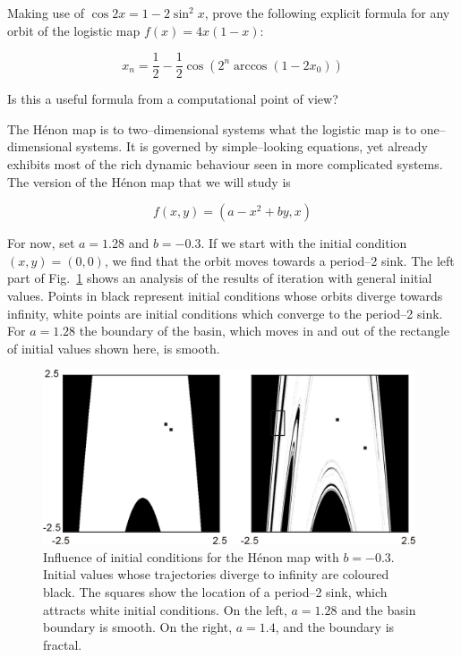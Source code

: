 \begin{exer}
Making use of $\cos 2x = 1- 2 \sin^2 x$, prove the following explicit formula for any orbit of the logistic map $f(x) = 4x(1-x)$:

$$x_n= \frac{1}{2} -\frac{1}{2} \cos(2^n\arccos(1-2x_0))$$

Is this a useful formula from a computational point of view?
\end{exer}


\pagebreak


The H\'{e}non map is to two--dimensional systems what the logistic map is to one--dimensional systems. It is governed by simple--looking equations, yet already exhibits most of the rich dynamic behaviour seen in more complicated systems. The version of the H\'{e}non map that we will study is

\begin{equation}
f(x,y) = (a-x^2+by, x)
\end{equation} 
 
For now, set $a=1.28$ and $b=-0.3$. If we start with the initial condition $(x,y)=(0,0)$, we find that the orbit moves towards a period--2 sink. The left part of Fig.~\ref{fig-henon-basin} shows an analysis of the results of iteration with general initial values. Points in black represent initial conditions whose orbits diverge towards infinity, white points are initial conditions which converge to the period--2 sink. For $a=1.28$ the boundary of the basin, which moves in and out of the rectangle of initial values shown here, is smooth.

\begin{figure}
\centering
\includegraphics[width=11cm]{dynamic/figures/henon_basin}
\caption{Influence of initial conditions for the H\'{e}non map with $b=-0.3$. Initial values whose trajectories diverge to infinity are coloured black. The squares show the location of a period--2 sink, which attracts white initial conditions. On the left, $a=1.28$ and the basin boundary is smooth. On the right, $a=1.4$, and the boundary is fractal.}
\label{fig-henon-basin}
\end{figure} 

